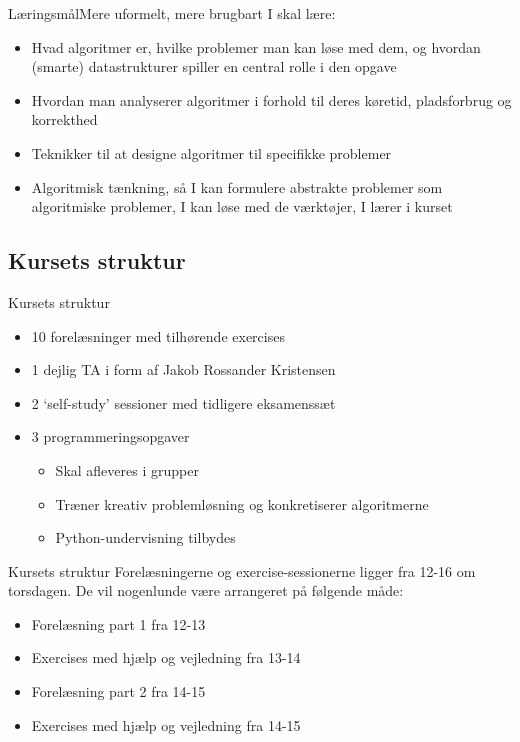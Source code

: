 \documentclass[aspectratio=1610]{beamer}
\begin{document}
\begin{frame}{Læringsmål}{Mere uformelt, mere brugbart}
    I skal lære:
    \pause
    \begin{itemize}
        \item Hvad algoritmer er, hvilke problemer man kan løse med dem, og
            hvordan (smarte) datastrukturer spiller en central rolle i den
            opgave
            \pause
        \item Hvordan man analyserer algoritmer i forhold til deres køretid,
            pladsforbrug og korrekthed
            \pause
        \item Teknikker til at designe algoritmer til specifikke problemer
            \pause
        \item Algoritmisk tænkning, så I kan formulere abstrakte problemer som
            algoritmiske problemer, I kan løse med de værktøjer, I lærer i
            kurset
    \end{itemize}
\end{frame}



\subsection[Struktur]{Kursets struktur}

\begin{frame}{Kursets struktur}
   \begin{itemize}
       \item 10 forelæsninger med tilhørende exercises \pause
       \item 1 dejlig TA i form af Jakob Rossander Kristensen \pause
       \item 2 `self-study' sessioner med tidligere eksamenssæt \pause
       \item 3 programmeringsopgaver \pause
           \begin{itemize}
               \item Skal afleveres i grupper
               \item Træner kreativ problemløsning og konkretiserer algoritmerne
               \item Python-undervisning tilbydes
           \end{itemize}
   \end{itemize} 
\end{frame}

\begin{frame}{Kursets struktur}
    Forelæsningerne og exercise-sessionerne ligger fra 12-16 om torsdagen. De
    vil nogenlunde være arrangeret på følgende måde:

    \pause

    \begin{itemize}
        \item Forelæsning part 1 fra 12-13
        \item Exercises med hjælp og vejledning fra 13-14
        \item Forelæsning part 2 fra 14-15
        \item Exercises med hjælp og vejledning fra 14-15
    \end{itemize}

\end{frame}
\end{document}

